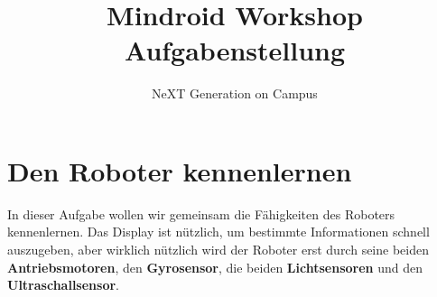 \documentclass[
	12pt,
	colorbacktitle,
	german,
	accentcolor=tud1c
]{tuddesign/tudexercise}
\begin{document}
	
	\title{Mindroid Workshop \\ Aufgabenstellung}
	\subtitle{NeXT Generation on Campus}

	\maketitle	
	

	
	
	
	
	
	
	
	
	\section{Den Roboter kennenlernen}
	In dieser Aufgabe wollen wir gemeinsam die Fähigkeiten des Roboters kennenlernen. Das Display ist nützlich, um bestimmte Informationen schnell auszugeben, aber wirklich nützlich wird der Roboter erst durch seine beiden \textbf{Antriebsmotoren}, den \textbf{Gyrosensor}, die beiden \textbf{Lichtsensoren} und den \textbf{Ultraschallsensor}.
	
	
	
\end{document}

